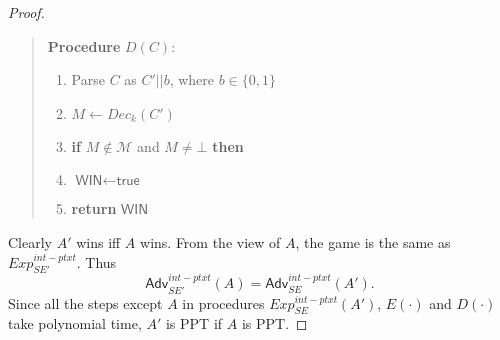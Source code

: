 \documentclass[12pt]{article}
\newcommand{\bits}{\{0,1\}}
\newcommand{\Adv}{\textsf{Adv}}
\newcommand{\tab}{\hspace{0.3in}}
\newcommand{\WIN}{\textsf{WIN}}
\newcommand{\true}{\textsf{true}}
\newcommand{\M}{\mathcal{M}}
\theoremstyle{definition}
\begin{document}
\begin{proof}
\begin{quote}
\begin{minipage}[t]{0.5\textwidth}
{\bf Procedure} $D(C)$:
\begin{enumerate}
\item Parse $C$ as $C'||b$, where $b \in \bits$
\item $M \gets Dec_k(C')$
\item {\bf if} $M \not\in \M$ and $M \not=\bot$ {\bf then}
\item \tab $\WIN \gets \true$
\item {\bf return} $\WIN$
\end{enumerate}
\end{minipage}
\end{quote}
Clearly $A'$ wins iff $A$ wins. From the view of $A$, the game is the same as $Exp_{SE'}^{int-ptxt}$. Thus
$$\Adv_{SE'}^{int-ptxt}(A) = \Adv_{SE}^{int-ptxt}(A').$$
Since all the steps except $A$ in procedures $Exp_{SE}^{int-ptxt}(A')$, $E(\cdot)$ and $D(\cdot)$ take polynomial time, $A'$ is PPT if $A$ is PPT.
\end{proof}
\end{document}
